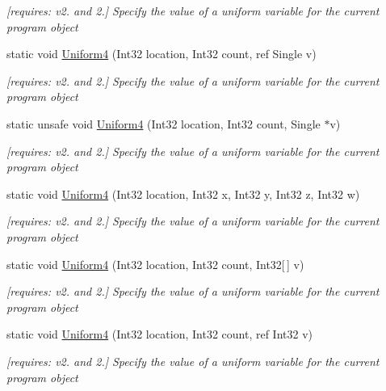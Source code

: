 \begin{DoxyCompactItemize}
\begin{DoxyCompactList}\small\item\em \mbox{[}requires\-: v2. and 2.\mbox{]} Specify the value of a uniform variable for the current program object \end{DoxyCompactList}\item 
static void \hyperlink{class_open_t_k_1_1_graphics_1_1_e_s20_1_1_g_l_a81de80809b7d3ddae55a56489a51faf1}{Uniform4} (Int32 location, Int32 count, ref Single v)
\begin{DoxyCompactList}\small\item\em \mbox{[}requires\-: v2. and 2.\mbox{]} Specify the value of a uniform variable for the current program object \end{DoxyCompactList}\item 
static unsafe void \hyperlink{class_open_t_k_1_1_graphics_1_1_e_s20_1_1_g_l_ae39fddc9869bdf5af8fe5bf354e9bff1}{Uniform4} (Int32 location, Int32 count, Single $\ast$v)
\begin{DoxyCompactList}\small\item\em \mbox{[}requires\-: v2. and 2.\mbox{]} Specify the value of a uniform variable for the current program object \end{DoxyCompactList}\item 
static void \hyperlink{class_open_t_k_1_1_graphics_1_1_e_s20_1_1_g_l_aebe2cebaf7763acbf87fe1173656e66f}{Uniform4} (Int32 location, Int32 x, Int32 y, Int32 z, Int32 w)
\begin{DoxyCompactList}\small\item\em \mbox{[}requires\-: v2. and 2.\mbox{]} Specify the value of a uniform variable for the current program object \end{DoxyCompactList}\item 
static void \hyperlink{class_open_t_k_1_1_graphics_1_1_e_s20_1_1_g_l_a6ea2e59da4afa71858d31b23f32c5338}{Uniform4} (Int32 location, Int32 count, Int32\mbox{[}$\,$\mbox{]} v)
\begin{DoxyCompactList}\small\item\em \mbox{[}requires\-: v2. and 2.\mbox{]} Specify the value of a uniform variable for the current program object \end{DoxyCompactList}\item 
static void \hyperlink{class_open_t_k_1_1_graphics_1_1_e_s20_1_1_g_l_a388a9f5ec396a0b71e861f388f2cf80f}{Uniform4} (Int32 location, Int32 count, ref Int32 v)
\begin{DoxyCompactList}\small\item\em \mbox{[}requires\-: v2. and 2.\mbox{]} Specify the value of a uniform variable for the current program object \end{DoxyCompactList}\item 

\end{DoxyCompactItemize}
